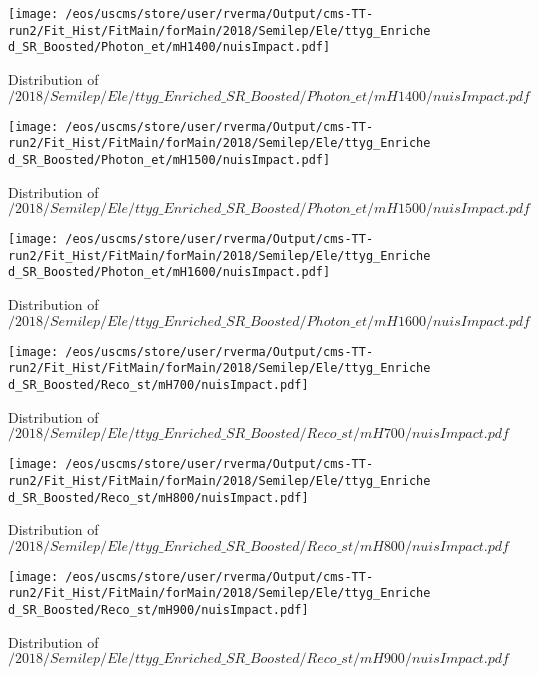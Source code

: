 \begin{figure}
\centering
\texttt{[image: /eos/uscms/store/user/rverma/Output/cms-TT-run2/Fit\_Hist/FitMain/forMain/2018/Semilep/Ele/ttyg\_Enriched\_SR\_Boosted/Photon\_et/mH1400/nuisImpact.pdf]}
\caption{Distribution of $/2018/Semilep/Ele/ttyg\_Enriched\_SR\_Boosted/Photon\_et/mH1400/nuisImpact.pdf$}
\end{figure}

\begin{figure}
\centering
\texttt{[image: /eos/uscms/store/user/rverma/Output/cms-TT-run2/Fit\_Hist/FitMain/forMain/2018/Semilep/Ele/ttyg\_Enriched\_SR\_Boosted/Photon\_et/mH1500/nuisImpact.pdf]}
\caption{Distribution of $/2018/Semilep/Ele/ttyg\_Enriched\_SR\_Boosted/Photon\_et/mH1500/nuisImpact.pdf$}
\end{figure}

\begin{figure}
\centering
\texttt{[image: /eos/uscms/store/user/rverma/Output/cms-TT-run2/Fit\_Hist/FitMain/forMain/2018/Semilep/Ele/ttyg\_Enriched\_SR\_Boosted/Photon\_et/mH1600/nuisImpact.pdf]}
\caption{Distribution of $/2018/Semilep/Ele/ttyg\_Enriched\_SR\_Boosted/Photon\_et/mH1600/nuisImpact.pdf$}
\end{figure}

\begin{figure}
\centering
\texttt{[image: /eos/uscms/store/user/rverma/Output/cms-TT-run2/Fit\_Hist/FitMain/forMain/2018/Semilep/Ele/ttyg\_Enriched\_SR\_Boosted/Reco\_st/mH700/nuisImpact.pdf]}
\caption{Distribution of $/2018/Semilep/Ele/ttyg\_Enriched\_SR\_Boosted/Reco\_st/mH700/nuisImpact.pdf$}
\end{figure}

\begin{figure}
\centering
\texttt{[image: /eos/uscms/store/user/rverma/Output/cms-TT-run2/Fit\_Hist/FitMain/forMain/2018/Semilep/Ele/ttyg\_Enriched\_SR\_Boosted/Reco\_st/mH800/nuisImpact.pdf]}
\caption{Distribution of $/2018/Semilep/Ele/ttyg\_Enriched\_SR\_Boosted/Reco\_st/mH800/nuisImpact.pdf$}
\end{figure}

\begin{figure}
\centering
\texttt{[image: /eos/uscms/store/user/rverma/Output/cms-TT-run2/Fit\_Hist/FitMain/forMain/2018/Semilep/Ele/ttyg\_Enriched\_SR\_Boosted/Reco\_st/mH900/nuisImpact.pdf]}
\caption{Distribution of $/2018/Semilep/Ele/ttyg\_Enriched\_SR\_Boosted/Reco\_st/mH900/nuisImpact.pdf$}
\end{figure}

